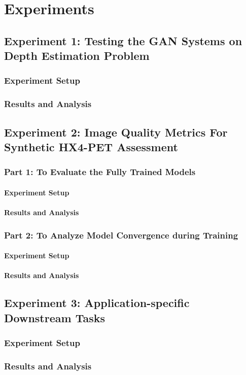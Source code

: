 \chapter{Experiments}
\label{Experiments}

\section{Experiment 1: Testing the GAN Systems on Depth Estimation Problem}
\subsection{Experiment Setup}
\subsection{Results and Analysis}


 
\section{Experiment 2: Image Quality Metrics For Synthetic HX4-PET Assessment}
\subsection{Part 1: To Evaluate the Fully Trained Models}
\subsubsection{Experiment Setup}
\subsubsection{Results and Analysis}

\subsection{Part 2: To Analyze Model Convergence during Training}
\subsubsection{Experiment Setup}
\subsubsection{Results and Analysis}



\section{Experiment 3: Application-specific Downstream Tasks}
\subsection{Experiment Setup}
\subsection{Results and Analysis}
